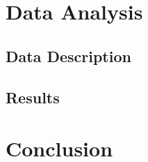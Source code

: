 \documentclass[12pt,a4paper,bibliography=totocnumbered,listof=totocnumbered]{scrartcl}
\begin{document}




\section{Data Analysis}

\subsection{Data Description}

\subsection{Results}


\section{Conclusion}

\pagebreak

\renewcommand\refname{List of Literature}






\pagebreak

\rhead{}
\setcounter{page}{1}
\end{document}
